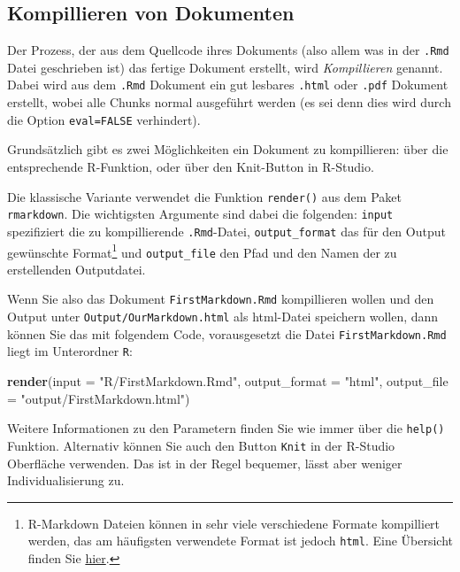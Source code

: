 \documentclass[]{book}
\newenvironment{Shaded}{\begin{snugshade}}{\end{snugshade}}
\newcommand{\KeywordTok}[1]{\textcolor[rgb]{0.13,0.29,0.53}{\textbf{#1}}}
\newcommand{\DataTypeTok}[1]{\textcolor[rgb]{0.13,0.29,0.53}{#1}}
\newcommand{\StringTok}[1]{\textcolor[rgb]{0.31,0.60,0.02}{#1}}
\newcommand{\NormalTok}[1]{#1}
\let\rmarkdownfootnote\footnote%
\def\footnote{\protect\rmarkdownfootnote}
\begin{document}
\subsection{Kompillieren von
Dokumenten}\label{kompillieren-von-dokumenten}

Der Prozess, der aus dem Quellcode ihres Dokuments (also allem was in
der \texttt{.Rmd} Datei geschrieben ist) das fertige Dokument erstellt,
wird \emph{Kompillieren} genannt. Dabei wird aus dem \texttt{.Rmd}
Dokument ein gut lesbares \texttt{.html} oder \texttt{.pdf} Dokument
erstellt, wobei alle Chunks normal ausgeführt werden (es sei denn dies
wird durch die Option \texttt{eval=FALSE} verhindert).

Grundsätzlich gibt es zwei Möglichkeiten ein Dokument zu kompillieren:
über die entsprechende R-Funktion, oder über den Knit-Button in
R-Studio.

Die klassische Variante verwendet die Funktion \texttt{render()} aus dem
Paket \texttt{rmarkdown}. Die wichtigsten Argumente sind dabei die
folgenden: \texttt{input} spezifiziert die zu kompillierende
\texttt{.Rmd}-Datei, \texttt{output\_format} das für den Output
gewünschte Format\footnote{R-Markdown Dateien können in sehr viele
  verschiedene Formate kompilliert werden, das am häufigsten verwendete
  Format ist jedoch \texttt{html}. Eine Übersicht finden Sie
  \href{https://bookdown.org/yihui/rmarkdown/output-formats.html}{hier}.}
und \texttt{output\_file} den Pfad und den Namen der zu erstellenden
Outputdatei.

Wenn Sie also das Dokument \texttt{FirstMarkdown.Rmd} kompillieren
wollen und den Output unter \texttt{Output/OurMarkdown.html} als
html-Datei speichern wollen, dann können Sie das mit folgendem Code,
vorausgesetzt die Datei \texttt{FirstMarkdown.Rmd} liegt im Unterordner
\texttt{R}:

\begin{Shaded}
\begin{Highlighting}[]
\KeywordTok{render}\NormalTok{(}\DataTypeTok{input =} \StringTok{"R/FirstMarkdown.Rmd"}\NormalTok{, }
       \DataTypeTok{output_format =} \StringTok{"html"}\NormalTok{, }
       \DataTypeTok{output_file =} \StringTok{"output/FirstMarkdown.html"}\NormalTok{)}
\end{Highlighting}
\end{Shaded}

Weitere Informationen zu den Parametern finden Sie wie immer über die
\texttt{help()} Funktion. Alternativ können Sie auch den Button
\texttt{Knit} in der R-Studio Oberfläche verwenden. Das ist in der Regel
bequemer, lässt aber weniger Individualisierung zu.
\end{document}
